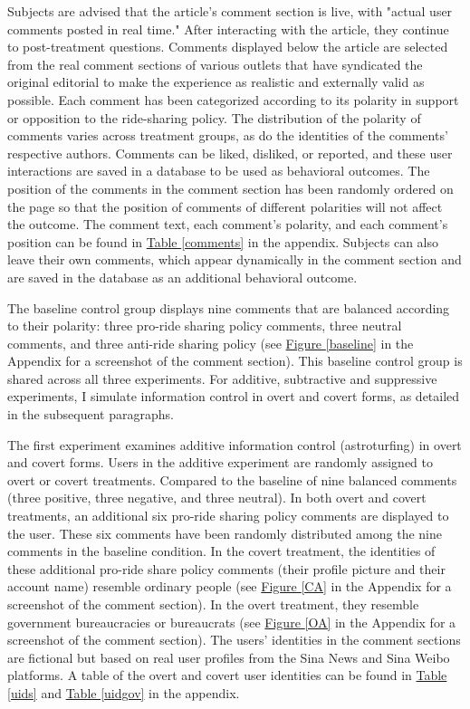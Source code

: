 \documentclass[11pt]{article}
\begin{document}
Subjects are advised that the article's comment section is live, with "actual user comments posted in real time." After interacting with the article, they continue to post-treatment questions. Comments displayed below the article are selected from the real comment sections of various outlets that have syndicated the original editorial to make the experience as realistic and externally valid as possible. Each comment has been categorized according to its polarity in support or opposition to the ride-sharing policy. The distribution of the polarity of comments varies across treatment groups, as do the identities of the comments' respective authors. Comments can be liked, disliked, or reported, and these user interactions are saved in a database to be used as behavioral outcomes. The position of the comments in the comment section has been randomly ordered on the page so that the position of comments of different polarities will not affect the outcome. The comment text, each comment's polarity, and each comment's position can be found in \hyperref[comments]{Table \ref*{comments}} in the appendix. Subjects can also leave their own comments, which appear dynamically in the comment section and are saved in the database as an additional behavioral outcome.

The baseline control group displays nine comments that are balanced according to their polarity: three pro-ride sharing policy comments, three neutral comments, and three anti-ride sharing policy (see \hyperref[baseline]{Figure \ref*{baseline}} in the Appendix for a screenshot of the comment section). This baseline control group is shared across all three experiments. For additive, subtractive and suppressive experiments, I simulate information control in overt and covert forms, as detailed in the subsequent paragraphs.

The first experiment examines additive information control (astroturfing) in overt and covert forms. Users in the additive experiment are randomly assigned to overt or covert treatments. Compared to the baseline of nine balanced comments (three positive, three negative, and three neutral). In both overt and covert treatments, an additional six pro-ride sharing policy comments are displayed to the user. These six comments have been randomly distributed among the nine comments in the baseline condition. In the covert treatment, the identities of these additional pro-ride share policy comments (their profile picture and their account name) resemble ordinary people (see \hyperref[CA]{Figure \ref*{CA}} in the Appendix for a screenshot of the comment section). In the overt treatment, they resemble government bureaucracies or bureaucrats  (see \hyperref[OA]{Figure \ref*{OA}} in the Appendix for a screenshot of the comment section). The users' identities in the comment sections are fictional but based on real user profiles from the Sina News and Sina Weibo platforms. A table of the overt and covert user identities can be found in \hyperref[uids]{Table \ref*{uids}} and \hyperref[uidgov]{Table \ref*{uidgov}} in the appendix.
\end{document}
